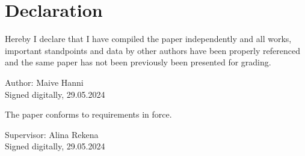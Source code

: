 \chapter*{Declaration}
\thispagestyle{empty}

Hereby I declare that I have compiled the paper independently and all works, important standpoints and data by other authors have been properly referenced and the same paper has not been previously been presented for grading.

Author: Maive Hanni \\
Signed digitally, 29.05.2024

\vspace{2cm}

The paper conforms to requirements in force.

Supervisor: Alina Rekena \\
Signed digitally, 29.05.2024



